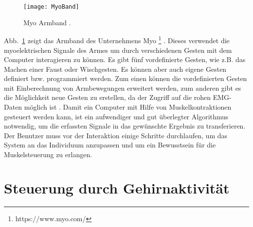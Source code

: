 \newline \newline
%
%
\begin{figure}
\centering
\texttt{[image: MyoBand]}
\caption{Myo Armband \cite{myoBand}.}
\label{fig:MyoBand}
\end{figure}
%
%
Abb.~\ref{fig:MyoBand} zeigt das Armband des Unternehmens Myo%
\footnote{https://www.myo.com/}
%
. Dieses verwendet die myoelektrischen Signale des Armes um durch verschiedenen Gesten mit dem Computer interagieren zu können. Es gibt fünf vordefinierte Gesten, wie z.B. das Machen einer Faust oder Wischgesten. Es können aber auch eigene Gesten definiert bzw. programmiert werden. Zum einen können die vordefinierten Gesten mit Einberechnung von Armbewegungen erweitert werden, zum anderen gibt es die Möglichkeit neue Gesten zu erstellen, da der Zugriff auf die rohen EMG-Daten möglich ist \cite{myoBand2}.
%
\newline \newline
Damit ein Computer mit Hilfe von Muskelkontraktionen gesteuert werden kann, ist ein aufwendiger und gut überlegter Algorithmus notwendig, um die erfassten Signale in das gewünschte Ergebnis zu transferieren. Der Benutzer muss vor der Interaktion einige Schritte durchlaufen, um das System an das Individuum anzupassen und um ein Bewusstsein für die Muskelsteuerung zu erlangen.


\section{Steuerung durch Gehirnaktivität}

